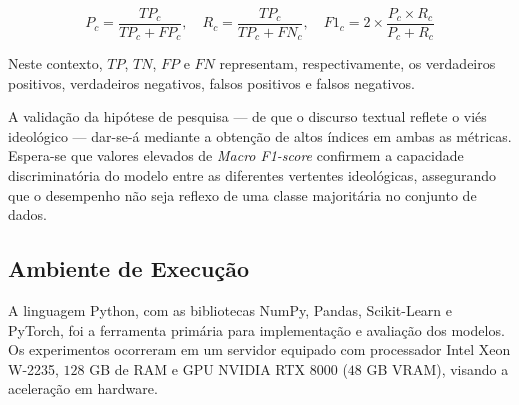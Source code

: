 
\
\begin{equation}\label{eq:prec_rec} 
  P_c = \frac{TP_c}{TP_c + FP_c}, \quad R_c = \frac{TP_c}{TP_c + FN_c}, \quad F1_c = 2 \times \frac{P_c \times R_c}{P_c + R_c} 
\end{equation}

Neste contexto, $TP$, $TN$, $FP$ e $FN$ representam, respectivamente, os verdadeiros positivos, 
verdadeiros negativos, falsos positivos e falsos negativos. 

A validação da hipótese de pesquisa --- de que o discurso textual reflete o viés ideológico --- dar-se-á 
mediante a obtenção de altos índices em ambas as métricas. 
Espera-se que valores elevados de \textit{Macro F1-score} confirmem a capacidade discriminatória do modelo entre
as diferentes vertentes ideológicas, assegurando que o desempenho não seja reflexo de uma classe majoritária no conjunto de dados.

\subsection{Ambiente de Execução}

A linguagem Python, com as bibliotecas NumPy, Pandas, Scikit-Learn e PyTorch, foi a ferramenta primária para implementação e avaliação dos modelos. 
Os experimentos ocorreram em um servidor equipado com processador Intel Xeon W-2235, $128$ GB de RAM e GPU NVIDIA RTX $8000$ ($48$ GB VRAM), 
visando a aceleração em hardware. %
